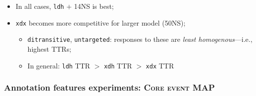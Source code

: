 \documentclass[handout,xcolor={dvipsnames}]{beamer}
\newcommand{\feat}[1]{\textsc{#1}}
\newcommand{\param}[1]{\texttt{#1}}
\begin{document}
\begin{frame}
\begin{itemize}
\item In all cases, \param{ldh} $+$ 14NS is best;
\item \param{xdx} becomes more competitive for larger model (50NS);
\begin{itemize}
\item \param{ditransitive}, \param{untargeted}: responses to these are \textit{least homogenous}---i.e., highest TTRs;
\item In general: \param{ldh} TTR $>$ \param{xdh} TTR $>$ \param{xdx} TTR
\end{itemize}
\end{itemize}

\end{frame}

\begin{frame}
\frametitle{Annotation features experiments: \feat{Core event} MAP}


\end{frame}
\end{document}
